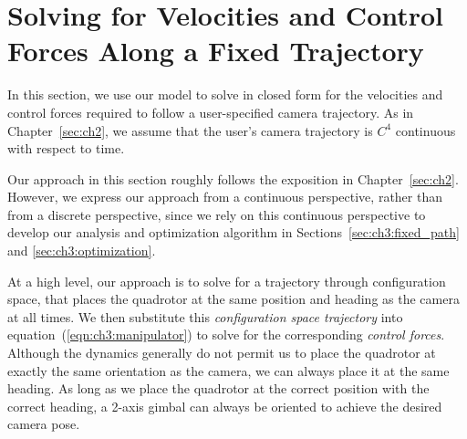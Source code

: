 \section{Solving for Velocities and Control Forces Along a Fixed Trajectory}
\label{sec:ch3:fixed_trajectory}

In this section, we use our model to solve in closed form for the velocities and control forces required to follow a user-specified camera trajectory.
As in Chapter~\ref{sec:ch2}, we assume that the user's camera trajectory is $C^4$ continuous with respect to time.

Our approach in this section roughly follows the exposition in Chapter~\ref{sec:ch2}.
However, we express our approach from a continuous perspective, rather than from a discrete perspective, since we rely on this continuous perspective to develop our analysis and optimization algorithm in Sections~\ref{sec:ch3:fixed_path} and \ref{sec:ch3:optimization}.

At a high level, our approach is to solve for a trajectory through configuration space, that places the quadrotor at the same position and heading as the camera at all times.
We then substitute this \emph{configuration space trajectory} into equation~(\ref{eqn:ch3:manipulator}) to solve for the corresponding \emph{control forces}.
Although the dynamics generally do not permit us to place the quadrotor at exactly the same orientation as the camera, we can always place it at the same heading.
As long as we place the quadrotor at the correct position with the correct heading, a 2-axis gimbal can always be oriented to achieve the desired camera pose.

